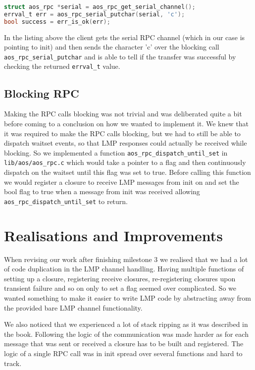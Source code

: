 \begin{lstlisting}[language=c, caption=Example of child calling an RPC function]
struct aos_rpc *serial = aos_rpc_get_serial_channel();
errval_t err = aos_rpc_serial_putchar(serial, 'c');
bool success = err_is_ok(err);
\end{lstlisting}

In the listing above the client gets the serial RPC channel (which in our case is pointing to init) and then sends the character 'c' over the blocking call \verb|aos_rpc_serial_putchar| and is able to tell if the transfer was successful by checking the returned \verb|errval_t| value.

\subsection{Blocking RPC}
Making the RPC calls blocking was not trivial and was deliberated quite a bit before coming to a conclusion on how we wanted to implement it. We knew that it was required to make the RPC calls blocking, but we had to still be able to dispatch waitset events, so that LMP responses could actually be received while blocking. So we implemented a function \verb|aos_rpc_dispatch_until_set| in \verb|lib/aos/aos_rpc.c| which would take a pointer to a flag and then continuously dispatch on the waitset until this flag was set to true. Before calling this function we would register a closure to receive LMP messages from init on and set the bool flag to true when a message from init was received allowing \verb|aos_rpc_dispatch_until_set| to return.

\section{Realisations and Improvements}

When revising our work after finishing milestone 3 we realised that we had a lot of code duplication in the LMP channel handling. Having multiple functions of setting up a closure, registering receive closures, re-registering closures upon transient failure and so on only to set a flag seemed over complicated. So we wanted something to make it easier to write LMP code by abstracting away from the provided bare LMP channel functionality.

We also noticed that we experienced a lot of stack ripping as it was described in the book. Following the logic of the communication was made harder as for each message that was sent or received a closure has to be built and registered. The logic of a single RPC call was in init spread over several functions and hard to track.

